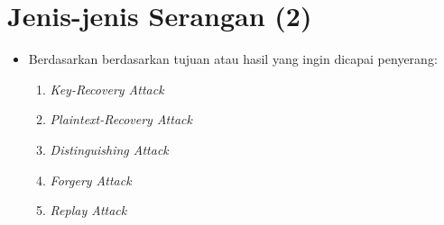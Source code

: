 \documentclass{article}
\begin{document}

\section*{Jenis-jenis Serangan (2)}

\begin{itemize}
    \item Berdasarkan berdasarkan tujuan atau hasil yang ingin dicapai penyerang:
    \begin{enumerate}
        \item \textit{Key-Recovery Attack}
        \item \textit{Plaintext-Recovery Attack}
        \item \textit{Distinguishing Attack}
        \item \textit{Forgery Attack}
        \item \textit{Replay Attack}
    \end{enumerate}
\end{itemize}
\end{document}
